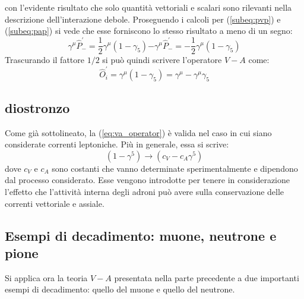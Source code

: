 \documentclass{subnucbo}
\begin{document}
con l'evidente risultato che solo quantità vettoriali e scalari sono rilevanti nella descrizione dell'interazione debole. Proseguendo i calcoli per (\ref{subeq:pvp}) e (\ref{subeq:pap}) si vede che esse forniscono lo stesso risultato a meno di un segno:
\begin{subequations}
        \begin{equation}
                \gamma ^ { \mu } \hat { P } _ { - } ^ { \prime } = \frac { 1 } { 2 } \gamma ^ { \mu } \left( 1 - \gamma _ { 5 } \right)
                \label{subeq:pvp_exp}
        \end{equation}
        \begin{equation}
                - \gamma ^ { \mu } \hat { P } _ { - } ^ { \prime } = - \frac { 1 } { 2 } \gamma ^ { \mu } \left( 1 - \gamma _ { 5 } \right)
                \label{subeq:pap_exp}
        \end{equation}
\end{subequations}
Trascurando il fattore $1/2$ si può quindi scrivere l'operatore $V-A$ come:
\begin{equation}
        \hat { O } _ { i } ^ { \prime } = \gamma ^ { \mu } \left( 1 - \gamma _ { 5 } \right) = \gamma ^ { \mu } - \gamma ^ { \mu } \gamma _ { 5 }
        \label{eq:va_operator}
\end{equation}

\subsection{diostronzo}
Come già sottolineato, la (\ref{eq:va_operator}) è valida nel caso in cui siano considerate correnti leptoniche. Più in generale, essa si scrive:
\begin{equation}
        \left( 1 - \gamma ^ { 5 } \right) \rightarrow \left( c _ { V } - c _ { A } \gamma ^ { 5 } \right)
\end{equation}
dove $c_{V}$ e $c_{A}$ sono costanti che vanno determinate sperimentalmente e dipendono dal processo considerato. Esse vengono introdotte per tenere in considerazione l'effetto che l'attività interna degli adroni può avere sulla conservazione delle correnti vettoriale e assiale.




\subsection{Esempi di decadimento: muone, neutrone e pione}
Si applica ora la teoria $V-A$ presentata nella parte precedente a due importanti esempi di decadimento: quello del muone e quello del neutrone.
\end{document}
